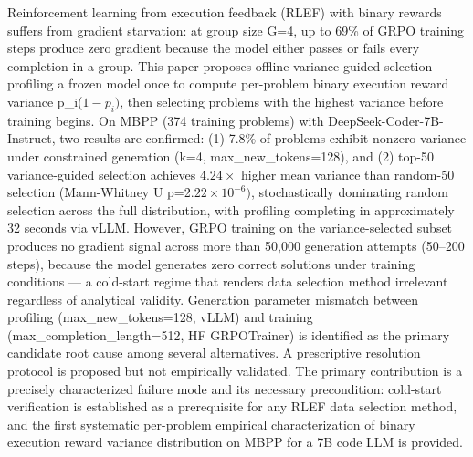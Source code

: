 
Reinforcement learning from execution feedback (RLEF) with binary rewards suffers from gradient starvation: at group size G=4, up to 69\% of GRPO training steps produce zero gradient because the model either passes or fails every completion in a group. This paper proposes offline variance-guided selection --- profiling a frozen model once to compute per-problem binary execution reward variance p\_i($1-p_{i})$, then selecting problems with the highest variance before training begins. On MBPP (374 training problems) with DeepSeek-Coder-7B-Instruct, two results are confirmed: (1) 7.8\% of problems exhibit nonzero variance under constrained generation (k=4, max\_new\_tokens=128), and (2) top-50 variance-guided selection achieves 4.$24\times$ higher mean variance than random-50 selection (Mann-Whitney U p=2.$22\times 10^{-6})$, stochastically dominating random selection across the full distribution, with profiling completing in approximately 32 seconds via vLLM. However, GRPO training on the variance-selected subset produces no gradient signal across more than 50,000 generation attempts (50--200 steps), because the model generates zero correct solutions under training conditions --- a cold-start regime that renders data selection method irrelevant regardless of analytical validity. Generation parameter mismatch between profiling (max\_new\_tokens=128, vLLM) and training (max\_completion\_length=512, HF GRPOTrainer) is identified as the primary candidate root cause among several alternatives. A prescriptive resolution protocol is proposed but not empirically validated. The primary contribution is a precisely characterized failure mode and its necessary precondition: cold-start verification is established as a prerequisite for any RLEF data selection method, and the first systematic per-problem empirical characterization of binary execution reward variance distribution on MBPP for a 7B code LLM is provided.

